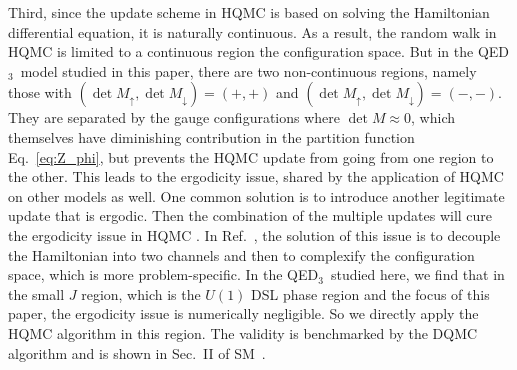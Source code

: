 \documentclass[aps,prl,twocolumn,superscriptaddress,showpacs,longbibliography]{revtex4-2}
\newcommand{\qed}{QED$_3$}
\begin{document}
Third, since the update scheme in HQMC is based on solving the Hamiltonian differential equation, it is naturally continuous. As a result, the random walk in HQMC is limited to a continuous region the configuration space. But in the \qed\ model studied in this paper, there are two non-continuous regions, namely those with $(\det M_\uparrow, \det M_\downarrow) = (+, +)$ and $(\det M_\uparrow, \det M_\downarrow) = (-, -)$. They are separated by the gauge configurations where $\det M \approx 0$, which themselves have diminishing contribution in the partition function Eq.~\eqref{eq:Z_phi}, but prevents the HQMC update from going from one region to the other. 
This leads to the ergodicity issue, shared by the application of HQMC on other models \cite{Beyl2018} as well. One common solution is to introduce another legitimate update that is ergodic. Then the combination of the multiple updates will cure the ergodicity issue in HQMC \cite{brooks2011handbook}. In Ref.~\cite{Beyl2018}, the solution of this issue is to decouple the Hamiltonian into two channels and then to complexify the configuration space, which is more problem-specific. In the \qed\ studied here, we find that in the small $J$ region, which is the $U(1)$ DSL phase region and the focus of this paper, the ergodicity issue is numerically negligible. So we directly apply the HQMC algorithm in this region. The validity is benchmarked by the DQMC algorithm and is shown in Sec.~II of SM~\cite{suppl}.\\

\vspace{3mm}  
\end{document}
